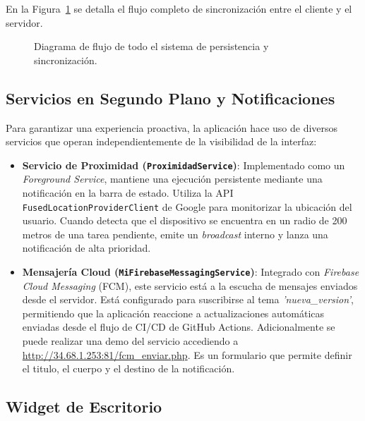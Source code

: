 \documentclass{article}
\begin{document}
En la Figura~\ref{fig:flujo_db} se detalla el flujo completo de sincronización entre el cliente y el servidor.

\begin{figure}[H]
    \centering
    \makebox[\textwidth][c]{
        
    }
    \caption{Diagrama de flujo de todo el sistema de persistencia y sincronización.}
    \label{fig:flujo_db}
\end{figure}
\subsection{Servicios en Segundo Plano y Notificaciones}

Para garantizar una experiencia proactiva, la aplicación hace uso de diversos servicios que operan independientemente de la visibilidad de la interfaz:
\begin{itemize}
    \item \textbf{Servicio de Proximidad (\texttt{ProximidadService})}: Implementado como un \textit{Foreground Service}, mantiene una ejecución persistente mediante una notificación en la barra de estado. Utiliza la API \texttt{FusedLocationProviderClient} de Google para monitorizar la ubicación del usuario. Cuando detecta que el dispositivo se encuentra en un radio de 200 metros de una tarea pendiente, emite un \textit{broadcast} interno y lanza una notificación de alta prioridad.
    \item \textbf{Mensajería Cloud (\texttt{MiFirebaseMessagingService})}: Integrado con \textit{Firebase Cloud Messaging} (FCM), este servicio está a la escucha de mensajes enviados desde el servidor. Está configurado para suscribirse al tema \textit{'nueva\_version'}, permitiendo que la aplicación reaccione a actualizaciones automáticas enviadas desde el flujo de CI/CD de GitHub Actions. Adicionalmente se puede realizar una demo del servicio accediendo a \url{http://34.68.1.253:81/fcm_enviar.php}. Es un formulario que permite definir el titulo, el cuerpo y el destino de la notificación.
\end{itemize}

\subsection{Widget de Escritorio}
\end{document}
